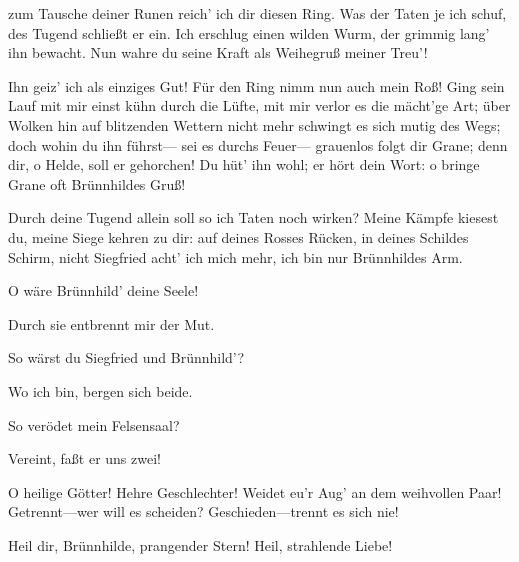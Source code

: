 \begin{drama}
zum Tausche deiner Runen
reich' ich dir diesen Ring.
Was der Taten je ich schuf,
des Tugend schließt er ein.
Ich erschlug einen wilden Wurm,
der grimmig lang' ihn bewacht.
Nun wahre du seine Kraft
als Weihegruß meiner Treu'!
 

\Brunnhildespeaks



Ihn geiz' ich als einziges Gut!
Für den Ring nimm nun auch mein Roß!
Ging sein Lauf mit mir
einst kühn durch die Lüfte,
mit mir verlor es die mächt'ge Art;
über Wolken hin auf blitzenden Wettern
nicht mehr schwingt es sich mutig des Wegs;
doch wohin du ihn führst---
sei es durchs Feuer---
grauenlos folgt dir Grane;
denn dir, o Helde,
soll er gehorchen!
Du hüt' ihn wohl;
er hört dein Wort:
o bringe Grane oft Brünnhildes Gruß!
 

\Siegfriedspeaks

Durch deine Tugend allein
soll so ich Taten noch wirken?
Meine Kämpfe kiesest du,
meine Siege kehren zu dir:
auf deines Rosses Rücken,
in deines Schildes Schirm,
nicht Siegfried acht' ich mich mehr,
ich bin nur Brünnhildes Arm.
 

\Brunnhildespeaks

O wäre Brünnhild' deine Seele!
 

\Siegfriedspeaks

Durch sie entbrennt mir der Mut.
 

\Brunnhildespeaks

So wärst du Siegfried und Brünnhild'?
 

\Siegfriedspeaks

Wo ich bin, bergen sich beide.
 

\Brunnhildespeaks



So verödet mein Felsensaal?
 

\Siegfriedspeaks

Vereint, faßt er uns zwei!
 

\Brunnhildespeaks



O heilige Götter!
Hehre Geschlechter!
Weidet eu'r Aug' an dem weihvollen Paar!
Getrennt---wer will es scheiden?
Geschieden---trennt es sich nie!
 

\Siegfriedspeaks

Heil dir, Brünnhilde, prangender Stern!
Heil, strahlende Liebe!
 

\Brunnhildespeaks


\end{drama}
